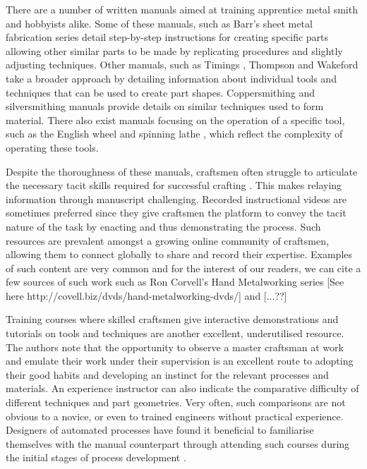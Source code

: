 There are a number of written manuals aimed at training apprentice metal smith and hobbyists alike. Some of these manuals, such as Barr's sheet metal fabrication series \citep{Barr2013ProfessionalFabrication,Barr2019SheetProjects} detail step-by-step instructions for creating specific parts allowing other similar parts to be made by replicating procedures and slightly adjusting techniques. Other manuals, such as Timings \citep{Timings2008SheetMetalwork}, Thompson \citep{Thompson2007ManufacturingProfessionals} and Wakeford \citep{Wakeford1985SheetWork} take a broader approach by detailing information about individual tools and techniques that can be used to create part shapes. Coppersmithing \citep{Fuller1904ArtForms} and silversmithing \citep{Hill2014ManufacturingProcesses} manuals provide details on similar techniques used to form material. There also exist manuals focusing on the operation of a specific tool, such as the English wheel \citep{Longyard2014LearningWheel} and spinning lathe \citep{Tuells1912MetalUsed}, which reflect the complexity of operating these tools.

Despite the thoroughness of these manuals, craftsmen often struggle to articulate the necessary tacit skills required for successful crafting \citep{Wood2009ACraftsmen}. This makes relaying information through manuscript challenging. Recorded instructional videos are sometimes preferred since they give craftsmen the platform to convey the tacit nature of the task by enacting and thus demonstrating the process. Such resources are prevalent amongst a growing online community of craftsmen, allowing them to connect globally to share and record their expertise. Examples of such content are very common and for the interest of our readers, we can cite a few sources of such work such as Ron Corvell's Hand Metalworking series [See here http://covell.biz/dvds/hand-metalworking-dvds/]
and [...??]

Training courses where skilled craftsmen give interactive demonstrations and tutorials on tools and techniques are another excellent, underutilised resource. The authors note that the opportunity to observe a master craftsman at work and emulate their work under their supervision is an excellent route to adopting their good habits and developing an instinct for the relevant processes and materials. An experience instructor can also indicate the comparative difficulty of different techniques and part geometries. Very often, such comparisons are not obvious to a novice, or even to trained engineers without practical experience. Designers of automated processes have found it beneficial to familiarise themselves with the manual counterpart through attending such courses during the initial stages of process development \citep{Ilangovan2016AnForming}.

